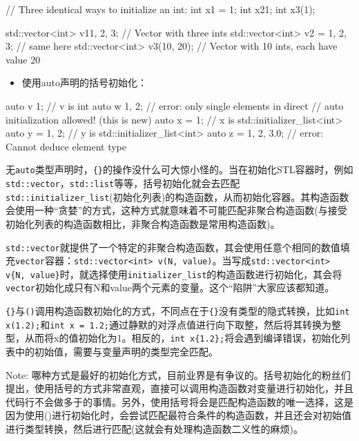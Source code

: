 \begin{codebox}[cpp]
// Three identical ways to initialize an int:
int x1 = 1;
int x2{1};
int x3(1);

std::vector<int> v1{1, 2, 3}; // Vector with three ints
std::vector<int> v2 = {1, 2, 3}; // same here
std::vector<int> v3(10, 20); // Vector with 10 ints, each have value 20
\end{codebox}

\begin{itemize}
\item 使用auto声明的括号初始化：

\end{itemize}

\begin{codebox}[cpp]
auto v {1}; // v is int
auto w {1, 2}; // error: only single elements in direct
              // auto initialization allowed! (this is new)
auto x = {1}; // x is std::initializer_list<int>
auto y = {1, 2}; // y is std::initializer_list<int>
auto z = {1, 2, 3.0}; // error: Cannot deduce element type
\end{codebox}


无\texttt{auto}类型声明时，\texttt{\{\}}的操作没什么可大惊小怪的。当在初始化STL容器时，例如\texttt{std::vector}，\texttt{std::list}等等，括号初始化就会去匹配\texttt{std::initializer\_list}(初始化列表)的构造函数，从而初始化容器。其构造函数会使用一种“贪婪”的方式，这种方式就意味着不可能匹配非聚合构造函数(与接受初始化列表的构造函数相比，非聚合构造函数是常用构造函数)。

\texttt{std::vector}就提供了一个特定的非聚合构造函数，其会使用任意个相同的数值填充\texttt{vector}容器：\texttt{std::vector<int> v(N, value)}。当写成\texttt{std::vector<int> v\{N, value\}}时，就选择使用\texttt{initializer\_list}的构造函数进行初始化，其会将\texttt{vector}初始化成只有N和value两个元素的变量。这个“陷阱”大家应该都知道。

\texttt{\{\}}与\texttt{()}调用构造函数初始化的方式，不同点在于\texttt{\{\}}没有类型的隐式转换，比如\texttt{int x(1.2);}和\texttt{int x = 1.2;}通过静默的对浮点值进行向下取整，然后将其转换为整型，从而将x的值初始化为1。相反的，\texttt{int x\{1.2\};}将会遇到编译错误，初始化列表中的初始值，需要与变量声明的类型完全匹配。

\begin{myInfoBox}
Note: 哪种方式是最好的初始化方式，目前业界是有争议的。括号初始化的粉丝们提出，使用括号的方式非常直观，直接可以调用构造函数对变量进行初始化，并且代码行不会做多于的事情。另外，使用{}括号将会是匹配构造函数的唯一选择，这是因为使用()进行初始化时，会尝试匹配最符合条件的构造函数，并且还会对初始值进行类型转换，然后进行匹配(这就会有处理构造函数二义性的麻烦)。
\end{myInfoBox}

